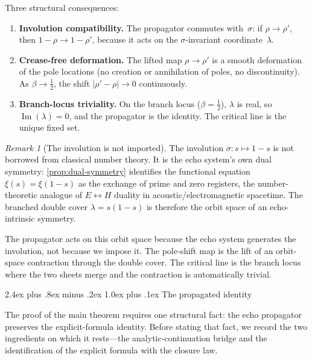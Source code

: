 \documentclass[11pt,a4paper]{article}
\makeatletter
\theoremstyle{plain}
\theoremstyle{definition}
\theoremstyle{remark}
\newtheorem{remark}[theorem]{Remark}
\numberwithin{equation}{section}
\renewcommand{\subsection}{%
  \@startsection{subsection}{2}{0pt}%
    {2.4ex plus .8ex minus .2ex}%
    {1.0ex plus .1ex}%
    {\normalfont\Large\bfseries\color{headingAccent}}%
}
\makeatother
\begin{document}
Three structural consequences:
\begin{enumerate}
  \item \textbf{Involution compatibility.}
    The propagator commutes with~\(\sigma\): if \(\rho\to\rho'\),
    then \(1-\rho\to1-\rho'\), because it acts on the
    \(\sigma\)-invariant coordinate~\(\lambda\).
  \item \textbf{Crease-free deformation.}
    The lifted map \(\rho\to\rho'\) is a smooth deformation of the
    pole locations (no creation or annihilation of poles, no
    discontinuity).  As \(\beta\to\tfrac12\), the shift
    \(|\rho'-\rho|\to0\) continuously.
  \item \textbf{Branch-locus triviality.}
    On the branch locus (\(\beta=\tfrac12\)), \(\lambda\) is real,
    so \(\operatorname{Im}(\lambda)=0\), and the propagator is the
    identity.  The critical line is the unique fixed set.
\end{enumerate}

\begin{remark}[The involution is not imported]
\label{rmk:involution-not-imported}
The involution \(\sigma\colon s\mapsto1-s\) is not borrowed from
classical number theory.  It is the echo system's own dual symmetry:
\cref{prop:dual-symmetry} identifies the functional equation
\(\xi(s)=\xi(1-s)\) as the exchange of prime and zero registers,
the number-theoretic analogue of \(E\leftrightarrow H\) duality in
acoustic/electromagnetic spacetime.  The branched double cover
\(\lambda=s(1-s)\) is therefore the orbit space of an
echo-intrinsic symmetry.

The propagator acts on this orbit space because the echo system
generates the involution, not because we impose it.  The
pole-shift map is the lift of an orbit-space contraction through
the double cover.  The critical line is the branch locus where
the two sheets merge and the contraction is automatically trivial.
\end{remark}

\subsection{The propagated identity}
\label{subsec:propagated-identity}

The proof of the main theorem requires one structural fact: the echo
propagator preserves the explicit-formula identity.  Before stating
that fact, we record the two ingredients on which it rests---the
analytic-continuation bridge and the identification of the
explicit formula with the closure law.
\end{document}

